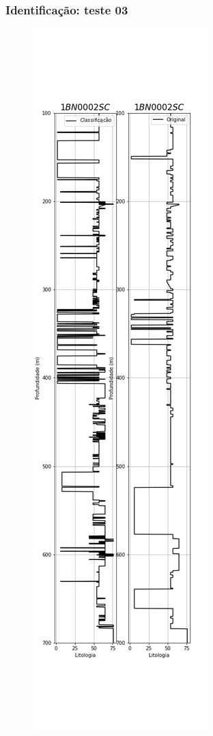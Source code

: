 \documentclass[aspectratio=10]{beamer} %
\begin{document}
\begin{frame}
	\frametitle{Identificação: teste 03}
	\begin{figure}[H]
		\centering
		\includegraphics[scale=0.18]{Imagens/result03.png}
		\label{IDt03}
	\end{figure} 
\end{frame}
\end{document}
